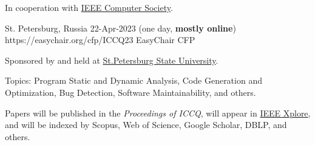 \documentclass{../cfp}
\begin{document}
\PrintLogo{}



In cooperation
with
\href{https://conferences.ieee.org/conferences_events/conferences/conferencedetails/53703}{IEEE Computer Society}.

\vspace{6pt}

\PrintAddress
  {St. Petersburg, Russia}
  {22-Apr-2023 (one day, \textbf{mostly online})}
  {https://easychair.org/cfp/ICCQ23}
  {EasyChair CFP}

\vspace{12pt}
%
%
\vspace{12pt}

Sponsored by and held at \href{https://english.spbu.ru}{St.Petersburg State University}.

Topics: Program Static and Dynamic Analysis,
Code Generation and Optimization,
Bug Detection, Software Maintainability, and others.

Papers will be published in the \textit{Proceedings of ICCQ},
will appear in \href{https://ieeexplore.ieee.org/Xplore/home.jsp}{IEEE Xplore\textsuperscript{\textregistered}},
and will be indexed by Scopus, Web of Science, Google Scholar, DBLP, and others.
\end{document}
